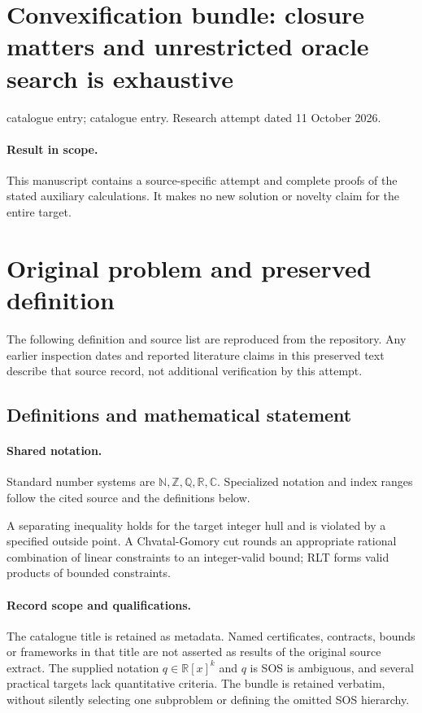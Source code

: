\documentclass[11pt]{article}
\begin{document}
\section*{Convexification bundle: closure matters and unrestricted oracle search is exhaustive}
\noindent catalogue entry; catalogue entry. Research attempt dated 11 October 2026.
\paragraph{Result in scope.}This manuscript contains a source-specific attempt and complete proofs of the stated auxiliary calculations. It makes no new solution or novelty claim for the entire target.
\section{Original problem and preserved definition}
The following definition and source list are reproduced from the repository. Any earlier inspection dates and reported literature claims in this preserved text describe that source record, not additional verification by this attempt.
\subsection{Definitions and mathematical statement}

\paragraph{Shared notation.}Standard number systems are $\mathbb N,\mathbb Z,\mathbb Q,\mathbb R,\mathbb C$. Specialized notation and index ranges follow the cited source and the definitions below.


A separating inequality holds for the target integer hull and is violated by a specified outside point. A Chvatal-Gomory cut rounds an appropriate rational combination of linear constraints to an integer-valid bound; RLT forms valid products of bounded constraints.
\paragraph{Record scope and qualifications.}
The catalogue title is retained as metadata. Named certificates, contracts, bounds or frameworks in that title are not asserted as results of the original source extract.
The supplied notation $q\in\mathbb R[x]^k$ and $q$ is SOS is ambiguous, and several practical targets lack quantitative criteria. The bundle is retained verbatim, without silently selecting one subproblem or defining the omitted SOS hierarchy.
\end{document}
